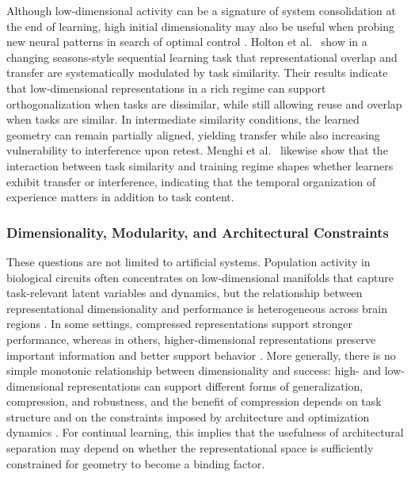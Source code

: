 \documentclass[letterpaper]{article}
\begin{document}
Although low-dimensional activity can be a signature of system consolidation at the end of learning, high initial dimensionality may also be useful when probing new neural patterns in search of optimal control \cite{gurnani2023signatures}. Holton et al.~\cite{holton2025humans} show in a changing seasons-style sequential learning task that representational overlap and transfer are systematically modulated by task similarity. Their results indicate that low-dimensional representations in a rich regime can support orthogonalization when tasks are dissimilar, while still allowing reuse and overlap when tasks are similar. In intermediate similarity conditions, the learned geometry can remain partially aligned, yielding transfer while also increasing vulnerability to interference upon retest. Menghi et al.~\cite{menghi2025impact} likewise show that the interaction between task similarity and training regime shapes whether learners exhibit transfer or interference, indicating that the temporal organization of experience matters in addition to task content.

\subsubsection{Dimensionality, Modularity, and Architectural Constraints}

These questions are not limited to artificial systems. Population activity in biological circuits often concentrates on low-dimensional manifolds that capture task-relevant latent variables and dynamics, but the relationship between representational dimensionality and performance is heterogeneous across brain regions \cite{yu2025dimensionality}. In some settings, compressed representations support stronger performance, whereas in others, higher-dimensional representations preserve important information and better support behavior \cite{yu2025dimensionality}. More generally, there is no simple monotonic relationship between dimensionality and success: high- and low-dimensional representations can support different forms of generalization, compression, and robustness, and the benefit of compression depends on task structure and on the constraints imposed by architecture and optimization dynamics \cite{flesch2022representation,yu2025dimensionality}. For continual learning, this implies that the usefulness of architectural separation may depend on whether the representational space is sufficiently constrained for geometry to become a binding factor.
\end{document}
